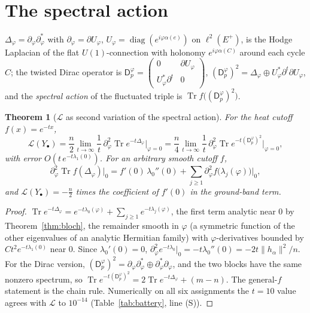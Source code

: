 \documentclass[11pt]{amsart}
\numberwithin{equation}{section}
\newtheorem{theorem}{Theorem}[section]
\theoremstyle{definition}
\theoremstyle{remark}
\newcommand{\cL}{\mathcal{L}}
\newcommand{\Dp}{\mathsf{D}_p}
\newcommand{\Tr}{\operatorname{Tr}}
\begin{document}
\section{The spectral action}\label{sec:action}

$\Delta_\varphi=\partial_\varphi\partial_\varphi^{*}$ with $\partial_\varphi=\partial U_\varphi$,
$U_\varphi=\operatorname{diag}(e^{i\varphi\alpha(e)})$ on $\ell^{2}(E^{+})$, is the Hodge
Laplacian of the flat $U(1)$-connection with holonomy $e^{i\varphi\alpha(C)}$ around each
cycle $C$; the twisted Dirac operator is
$\Dp^{\varphi}=\begin{pmatrix}0&\partial U_\varphi\\U_\varphi^{*}\partial^{t}&0\end{pmatrix}$,
$(\Dp^{\varphi})^{2}=\Delta_\varphi\oplus U_\varphi^{*}\partial^{t}\partial U_\varphi$, and the
\emph{spectral action} \cite{CC} of the fluctuated triple is $\Tr f\bigl((\Dp^{\varphi})^{2}\bigr)$.

\begin{theorem}[$\cL$ as second variation of the spectral action]\label{thm:action}
For the heat cutoff $f(x)=e^{-tx}$,
\[
\cL(Y_\bullet)=\frac n2\lim_{t\to\infty}\frac1t\,\partial_\varphi^{2}\Tr e^{-t\Delta_\varphi}\Big|_{\varphi=0}
=\frac n4\lim_{t\to\infty}\frac1t\,\partial_\varphi^{2}\Tr e^{-t(\Dp^{\varphi})^{2}}\Big|_{\varphi=0},
\]
with error $O(t\,e^{-t\lambda_1(0)})$. For an arbitrary smooth cutoff $f$,
\[
\partial_\varphi^{2}\Tr f(\Delta_\varphi)\big|_{0}=f'(0)\,\lambda_0''(0)+\sum_{j\ge1}\partial_\varphi^{2}f\bigl(\lambda_j(\varphi)\bigr)\big|_0 ,
\]
and $\cL(Y_\bullet)=-\frac n2$ times the coefficient of $f'(0)$ in the ground-band term.
\end{theorem}

\begin{proof}
$\Tr e^{-t\Delta_\varphi}=e^{-t\lambda_0(\varphi)}+\sum_{j\ge1}e^{-t\lambda_j(\varphi)}$, the
first term analytic near $0$ by Theorem~\ref{thm:bloch}, the remainder smooth in $\varphi$
(a symmetric function of the other eigenvalues of an analytic Hermitian family) with
$\varphi$-derivatives bounded by $Ct^{2}e^{-t\lambda_1(0)}$ near $0$. Since
$\lambda_0'(0)=0$, $\partial_\varphi^{2}e^{-t\lambda_0}|_0=-t\lambda_0''(0)=-2t\|h_\alpha\|^{2}/n$.
For the Dirac version,
$(\Dp^{\varphi})^{2}=\partial_\varphi\partial_\varphi^{*}\oplus\partial_\varphi^{*}\partial_\varphi$, and the two
blocks have the same nonzero spectrum, so $\Tr e^{-t(\Dp^{\varphi})^{2}}=2\Tr e^{-t\Delta_\varphi}+(m-n)$.
The general-$f$ statement is the chain rule. Numerically on all six assignments the
$t=10$ value agrees with $\cL$ to $10^{-14}$ (Table~\ref{tab:battery}, line (S)).
\end{proof}
\end{document}
